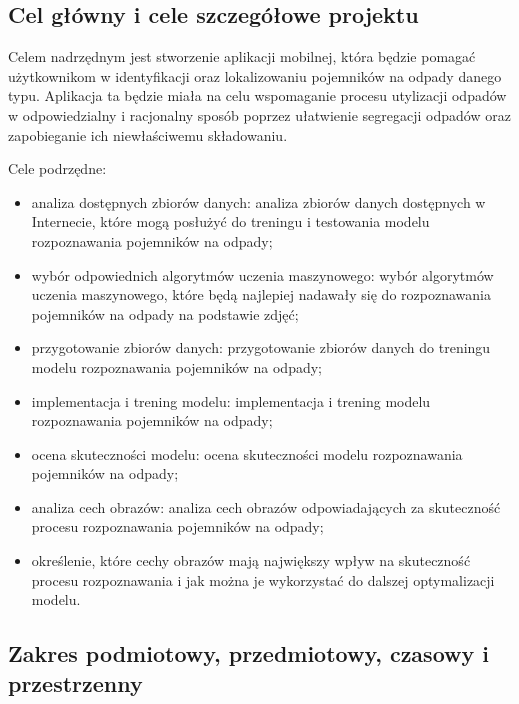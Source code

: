 \documentclass[12pt, a4paper, twoside, openany]{book}
\begin{document}
\subsection{Cel główny i cele szczegółowe projektu}

Celem nadrzędnym jest stworzenie aplikacji mobilnej, która będzie pomagać użytkownikom w identyfikacji oraz lokalizowaniu pojemników na odpady danego typu. Aplikacja ta będzie miała na celu wspomaganie procesu utylizacji odpadów w odpowiedzialny i racjonalny sposób poprzez ułatwienie segregacji odpadów oraz zapobieganie ich niewłaściwemu składowaniu.

Cele podrzędne:
\begin{itemize}
    \item analiza dostępnych zbiorów danych: analiza zbiorów danych dostępnych w Internecie, które mogą posłużyć do treningu i testowania modelu rozpoznawania pojemników na odpady;
    \item wybór odpowiednich algorytmów uczenia maszynowego: wybór algorytmów uczenia maszynowego, które będą najlepiej nadawały się do rozpoznawania pojemników na odpady na podstawie zdjęć;
    \item przygotowanie zbiorów danych: przygotowanie zbiorów danych do treningu modelu rozpoznawania pojemników na odpady;
    \item implementacja i trening modelu: implementacja i trening modelu rozpoznawania pojemników na odpady;
    \item ocena skuteczności modelu: ocena skuteczności modelu rozpoznawania pojemników na odpady;
    \item analiza cech obrazów: analiza cech obrazów odpowiadających za skuteczność procesu rozpoznawania pojemników na odpady;
    \item określenie, które cechy obrazów mają największy wpływ na skuteczność procesu rozpoznawania i jak można je wykorzystać do dalszej optymalizacji modelu.
\end{itemize}

\subsection{Zakres podmiotowy, przedmiotowy, czasowy i przestrzenny}
\end{document}

